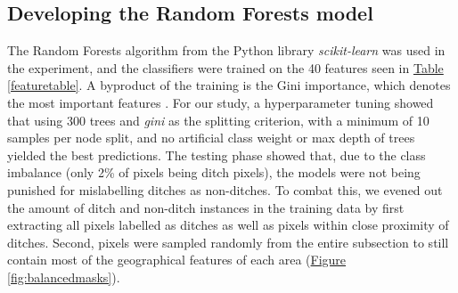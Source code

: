 \documentclass[11pt, review]{elsarticle} %
\begin{document}
\subsection{Developing the Random Forests model}

The Random Forests \citep{breiman} algorithm from the Python library \textit{scikit-learn} \citep{scikit-learn} was used in the experiment, and the classifiers were trained on the 40 features seen in \hyperref[featuretable]{Table} \ref{featuretable}. A byproduct of the training is the Gini importance, which denotes the most important features \citep{gini}. For our study, a hyperparameter tuning showed that using 300 trees and \textit{gini} as the splitting criterion, with a minimum of 10 samples per node split, and no artificial class weight or max depth of trees yielded the best predictions. The testing phase showed that, due to the class imbalance (only 2\% of pixels being ditch pixels), the models were not being punished for mislabelling ditches as non-ditches. To combat this, we evened out the amount of ditch and non-ditch instances in the training data by first extracting all pixels labelled as ditches as well as pixels within close proximity of ditches. Second, pixels were sampled randomly from the entire subsection to still contain most of the geographical features of each area (\hyperref[fig:balancedmasks]{Figure} \ref{fig:balancedmasks}).
\end{document}
